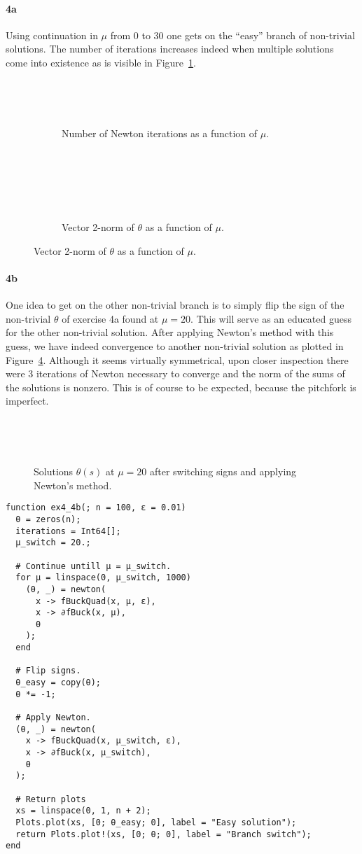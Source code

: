 \documentclass[a4paper]{article}
\begin{document}
  \paragraph{4a} Using continuation in $\mu$ from $0$ to $30$ one gets on the ``easy'' branch of non-trivial solutions. The number of iterations increases indeed when multiple solutions come into existence as is visible in Figure~\ref{fig:newton_iters_4a}.

  \begin{figure}[h]
    \begin{subfigure}[t]{0.5\textwidth}
      ~
      \caption{Number of Newton iterations as a function of $\mu.$}~
      \label{fig:newton_iters_4a}
    \end{subfigure}~
    \begin{subfigure}[t]{0.5\textwidth}
      ~
      \caption{Vector 2-norm of $\theta$ as a function of $\mu.$}~
      \label{fig:newton_iters_4a_two_norm}
    \end{subfigure}
  \end{figure}

  \newpage
  \paragraph{4b} One idea to get on the other non-trivial branch is to simply flip the sign of the non-trivial $\theta$ of exercise 4a found at $\mu = 20.$ This will serve as an educated guess for the other non-trivial solution. After applying Newton's method with this guess, we have indeed convergence to another non-trivial solution as plotted in Figure~\ref{fig:ex4b}. Although it seems virtually symmetrical, upon closer inspection there were 3 iterations of Newton necessary to converge and the norm of the sums of the solutions is nonzero. This is of course to be expected, because the pitchfork is imperfect.

  \begin{figure}[b]
    \centering
    ~
    \caption{Solutions $\theta(s)$ at $\mu = 20$ after switching signs and applying Newton's method.}~
    \label{fig:ex4b}~
  \end{figure}

\begin{verbatim}
function ex4_4b(; n = 100, ɛ = 0.01)
  θ = zeros(n);
  iterations = Int64[];
  μ_switch = 20.;

  # Continue untill μ = μ_switch.
  for μ = linspace(0, μ_switch, 1000)
    (θ, _) = newton(
      x -> fBuckQuad(x, μ, ɛ),
      x -> ∂fBuck(x, μ),
      θ
    );
  end

  # Flip signs.
  θ_easy = copy(θ);
  θ *= -1;

  # Apply Newton.
  (θ, _) = newton(
    x -> fBuckQuad(x, μ_switch, ɛ), 
    x -> ∂fBuck(x, μ_switch),
    θ
  );

  # Return plots
  xs = linspace(0, 1, n + 2);
  Plots.plot(xs, [0; θ_easy; 0], label = "Easy solution");
  return Plots.plot!(xs, [0; θ; 0], label = "Branch switch");
end
\end{verbatim}
\end{document}

